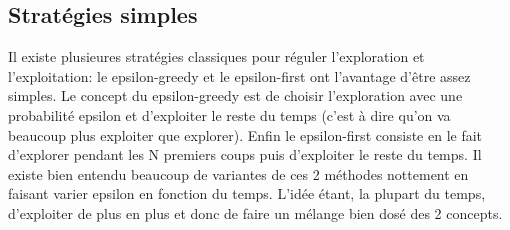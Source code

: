 \documentclass[12pt]{article}
\begin{document}
\subsection{Stratégies simples}
Il existe plusieures stratégies classiques pour réguler l'exploration et l'exploitation: le epsilon-greedy et le epsilon-first ont l'avantage d'être assez simples. Le concept du epsilon-greedy est de choisir l'exploration avec une probabilité epsilon et d'exploiter le reste du temps (c'est à dire qu'on va beaucoup plus exploiter que explorer). Enfin le epsilon-first consiste en le fait d'explorer pendant les N premiers coups puis d'exploiter le reste du temps. Il existe bien entendu beaucoup de variantes de ces 2 méthodes nottement en faisant varier epsilon en fonction du temps. L'idée étant, la plupart du temps, d'exploiter de plus en plus et donc de faire un mélange bien dosé des 2 concepts.
\end{document}
